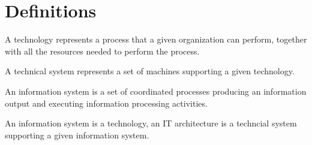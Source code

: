 \section{Definitions}

\begin{definition}
    A technology represents a process that a given organization can perform, together with all the resources needed to perform the process. 
\end{definition}
\begin{definition}
    A technical system represents a set of machines supporting a given technology.
\end{definition}
\begin{definition}
    An information system is a set of coordinated processes producing an information output and executing information processing activities. 
\end{definition}
\begin{definition}
    An information system is a technology, an IT architecture is a techncial system supporting a given information system.
\end{definition}